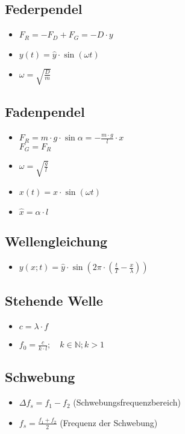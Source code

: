 \documentclass[paper = a4, twocolumn]{scrartcl}
\begin{document}
\subsection{Federpendel}
\begin{itemize}
\item
	\( F_R = -F_D + F_G = -D \cdot y \)
\item
	\( y(t) = \hat{y} \cdot \sin(\omega t) \)
\item
	\( \omega = \sqrt{\frac{D}{m}} \)
\end{itemize}

\subsection{Fadenpendel}
\begin{itemize}
\item
	\( F_R = m \cdot g \cdot \sin \alpha = - \frac{m \cdot g}{l} \cdot x \)\\
	\( F_G = F_R \)
\item
	\( \omega = \sqrt{\frac{g}{l}} \)
\item
	\( x(t) = \hat{x} \cdot \sin(\omega t) \)
\item
	\( \hat{x} = \alpha \cdot l \)
\end{itemize}

\subsection{Wellengleichung}
\begin{itemize}
\item
	\( y(x; t) = \hat{y} \cdot \sin(2 \pi \cdot (\frac{t}{T} -
	\frac{x}{\lambda}) ) \)
\end{itemize}

\subsection{Stehende Welle}
\begin{itemize}
\item
	\( c = \lambda \cdot f \)
\item
	\( f_0 = \frac{c}{k \cdot l}; \quad k \in \mathbb{N}; k > 1 \)
\end{itemize}

\subsection{Schwebung}
\begin{itemize}
\item
	\( \Delta f_s = f_1 - f_2 \) (Schwebungsfrequenzbereich)
\item
	\( f_s = \frac{f_1 + f_2}{2} \) (Frequenz der Schwebung)
\end{itemize}
\end{document}
